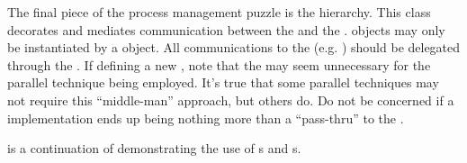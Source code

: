 The final piece of the process management puzzle is the
 hierarchy.  This class decorates and
mediates communication between the  and the .  
 objects may only be instantiated by
a  object.  All communications to the 
(e.g. ) should be delegated through the
.  If defining a new , note
that the  may seem unnecessary for the
parallel technique being employed.  It's true
that some parallel techniques may not require this ``middle-man''
approach, but others do.  Do not be concerned if a  implementation ends up being nothing more than a ``pass-thru'' to
the .

 is a continuation of
 demonstrating the use of s
and s.

